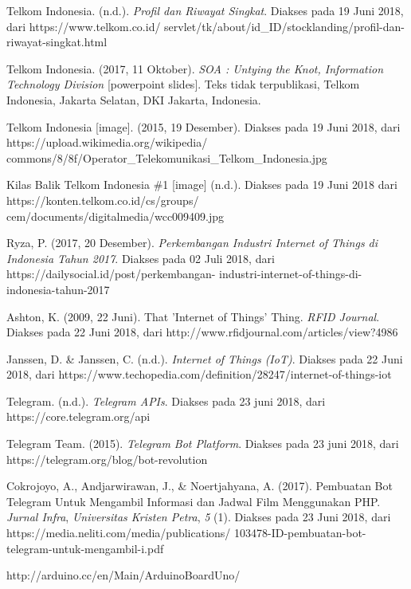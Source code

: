 \begin{thebibliography}{9}
	
	Telkom Indonesia. (n.d.). \textit{Profil dan Riwayat Singkat}. Diakses pada 19 Juni 2018, dari  https://www.telkom.co.id/ servlet/tk/about/id\_ID/stocklanding/profil-dan-riwayat-singkat.html
	
	Telkom Indonesia. (2017, 11 Oktober). \textit{SOA : Untying the Knot, Information Technology Division} [powerpoint slides]. Teks tidak terpublikasi, Telkom Indonesia, Jakarta Selatan, DKI Jakarta, Indonesia. 
	

	Telkom Indonesia [image]. (2015, 19 Desember). Diakses pada 19 Juni 2018, dari https://upload.wikimedia.org/wikipedia/ commons/8/8f/Operator\_Telekomunikasi\_Telkom\_Indonesia.jpg
	

	Kilas Balik Telkom Indonesia \#1 [image] (n.d.). Diakses pada 19 Juni 2018 dari https://konten.telkom.co.id/cs/groups/ cem/documents/digitalmedia/wcc009409.jpg
	
	Ryza, P. (2017, 20 Desember). 
	\textit{Perkembangan Industri Internet of Things di Indonesia Tahun 2017}. Diakses pada 02 Juli 2018, dari https://dailysocial.id/post/perkembangan- industri-internet-of-things-di-indonesia-tahun-2017

	Ashton, K. (2009, 22 Juni). That 'Internet of Things' Thing. \textit{RFID Journal}. Diakses pada 22 Juni 2018, dari http://www.rfidjournal.com/articles/view?4986
	
	Janssen, D. \& Janssen, C. (n.d.). \textit{Internet of Things (IoT)}. Diakses pada 22 Juni 2018, dari https://www.techopedia.com/definition/28247/internet-of-things-iot
	

	Telegram. (n.d.). \textit{Telegram APIs}. Diakses pada 23 juni 2018, dari https://core.telegram.org/api
	

	Telegram Team. (2015). \textit{Telegram Bot Platform}. Diakses pada 23 juni 2018, dari https://telegram.org/blog/bot-revolution
	

	Cokrojoyo, A., Andjarwirawan, J., \&  Noertjahyana, A. (2017). Pembuatan Bot Telegram Untuk Mengambil Informasi dan Jadwal Film Menggunakan PHP. \textit{Jurnal Infra}, \textit{Universitas Kristen Petra}, \textit{5} (1). Diakses pada 23 Juni 2018, dari https://media.neliti.com/media/publications/ 103478-ID-pembuatan-bot-telegram-untuk-mengambil-i.pdf
	
	http://arduino.cc/en/Main/ArduinoBoardUno/
	
\end{thebibliography}
